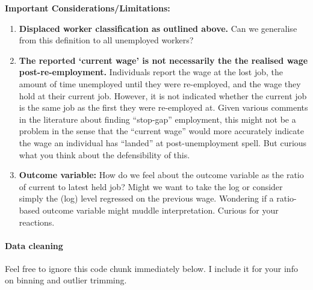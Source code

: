 \documentclass[
]{article}
\providecommand{\tightlist}{%
  \setlength{\itemsep}{0pt}\setlength{\parskip}{0pt}}
\begin{document}
\textbf{Important Considerations/Limitations:}

\begin{enumerate}
\def\labelenumi{\arabic{enumi}.}
\tightlist
\item
  \textbf{Displaced worker classification as outlined above.} Can we
  generalise from this definition to all unemployed workers?
\item
  \textbf{The reported `current wage' is not necessarily the the
  realised wage post-re-employment.} Individuals report the wage at the
  lost job, the amount of time unemployed until they were re-employed,
  and the wage they hold at their current job. However, it is not
  indicated whether the current job is the same job as the first they
  were re-employed at. Given various comments in the literature about
  finding ``stop-gap'' employment, this might not be a problem in the
  sense that the ``current wage'' would more accurately indicate the
  wage an individual has ``landed'' at post-unemployment spell. But
  curious what you think about the defensibility of this.
\item
  \textbf{Outcome variable:} How do we feel about the outcome variable
  as the ratio of current to latest held job? Might we want to take the
  log or consider simply the (log) level regressed on the previous wage.
  Wondering if a ratio-based outcome variable might muddle
  interpretation. Curious for your reactions.
\end{enumerate}

\paragraph{Data cleaning}\label{data-cleaning}

Feel free to ignore this code chunk immediately below. I include it for
your info on binning and outlier trimming.
\end{document}
